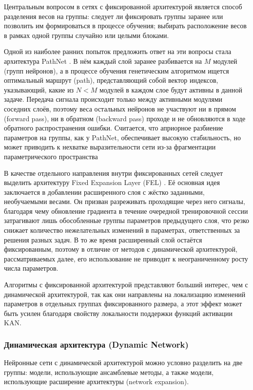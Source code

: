 \documentclass[a4paper,14pt]{extarticle}
\begin{document}
Центральным вопросом в сетях с фиксированной архитектурой является способ
разделения весов на группы: следует ли фиксировать группы заранее или позволить
им формироваться в процессе обучения; выбирать расположение весов в рамках одной
группы случайно или целыми блоками.

Одной из наиболее ранних попыток предложить ответ на эти вопросы стала
архитектура PathNet \cite{fernando2017pathnet}. В нём каждый слой заранее разбивается на \(M\)
модулей (групп нейронов), а в процессе обучения генетическим алгоритмом ищется
оптимальный маршрут (path), представляющий собой вектор индексов, указывающий,
какие из \(N<M\) модулей в каждом слое будут активны в данной задаче. Передача сигнала
происходит только между активными модулями соседних слоёв, поэтому веса
остальных нейронов не участвуют ни в прямом (forward pass), ни в обратном
(backward pass) проходе и не обновляются в ходе обратного распространения
ошибки. Считается, что априорное разбиение параметров на группы, как у PathNet,
обеспечивает высокую стабильность, но может приводить к нехватке выразительности
сети из-за фрагментации параметрического пространства

В качестве отдельного направления внутри фиксированных сетей следует выделить
архитектуру Fixed Expansion Layer (FEL) \cite{coop2013ensemble}. Её основная
идея заключается в добавлении расширенного слоя с жёстко заданными, необучаемыми
весами. Он призван разреживать проходящие через него сигналы, благодаря
чему обновление градиента в течение очередной тренировочной сессии затрагивают
лишь обособленные группы параметров предыдущего слоя, что резко снижает количество
нежелательных изменений в параметрах, ответственных за решения разных задач. 
В то же время расширенный слой остаётся фиксированным, поэтому в отличие от
методов с динамической архитектурой, рассматриваемых далее, его использование не
приводит к неограниченному росту числа параметров.

Алгоритмы с фиксированной архитектурой представляют больший интерес, чем с
динамической архитектурой, так как они направлены на локализацию изменений
параметров в отдельных группах фиксированного размера, а этот эффект может быть
усилен благодаря свойству локальности поддержки функций активации KAN.
\subsubsection{Динамическая архитектура (Dynamic Network)}
Нейронные сети с динамической архитектурой можно условно разделить на две
группы: модели, использующие ансамблевые методы, а также модели, использующие
расширение архитектуры (network expansion).
\end{document}
